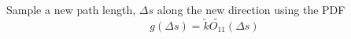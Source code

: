 \begin{minipage}{7cm}
\begin{sf}
Sample a new path length, $\Delta s$ along the new direction using the PDF
\[
g(\Delta s)=\tilde{k}\tilde{O_{11}}(\Delta s)
\]
\end{sf}
\end{minipage}
